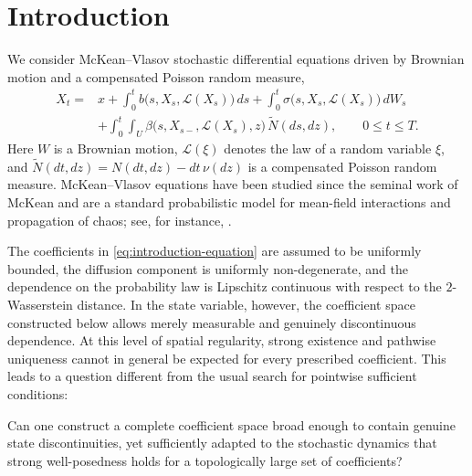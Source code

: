 \documentclass[12pt,oneside, reqno]{amsart}
\numberwithin{equation}{section}
\begin{document}
	\maketitle
	
	
	
	
	
	\section{Introduction}
	\label{sec:introduction}
	
	We consider McKean--Vlasov stochastic differential equations driven by
	Brownian motion and a compensated Poisson random measure,
	\begin{equation}
		\label{eq:introduction-equation}
		\begin{aligned}
			X_t
			={}&x
			+\int_0^t b\bigl(s,X_s,\mathcal L(X_s)\bigr)\,ds
			+\int_0^t \sigma\bigl(s,X_s,\mathcal L(X_s)\bigr)\,dW_s
			\\
			&+\int_0^t\int_U
			\beta\bigl(s,X_{s-},\mathcal L(X_s),z\bigr)\,
			\widetilde N(ds,dz),
			\qquad 0\le t\le T.
		\end{aligned}
	\end{equation}
	Here $W$ is a Brownian motion, $\mathcal L(\xi)$ denotes the law of a
	random variable $\xi$, and $\widetilde N(dt,dz)=N(dt,dz)-dt\,\nu(dz)$
	is a compensated Poisson random measure. McKean--Vlasov equations have
	been studied since the seminal work of McKean \cite{Mckean-1966} and are
	a standard probabilistic model for mean-field interactions and
	propagation of chaos; see, for instance, \cite{Sznitman-1991}.
	
	The coefficients in \eqref{eq:introduction-equation} are assumed to be
	uniformly bounded, the diffusion component is uniformly non-degenerate,
	and the dependence on the probability law is Lipschitz continuous with
	respect to the $2$-Wasserstein distance. In the state variable, however,
	the coefficient space constructed below allows merely measurable and
	genuinely discontinuous dependence. At this level of spatial regularity,
	strong existence and pathwise uniqueness cannot in general be expected
	for every prescribed coefficient. This leads to a question different
	from the usual search for pointwise sufficient conditions:
	
Can one construct a complete coefficient space broad enough to
		contain genuine state discontinuities, yet sufficiently adapted to the
		stochastic dynamics that strong well-posedness holds for a topologically
		large set of coefficients?
	
\end{document}

